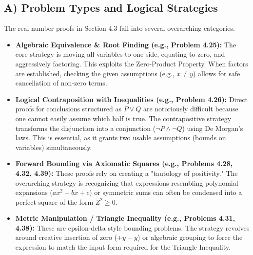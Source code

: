 \documentclass[11pt]{article}
\theoremstyle{definition}
\theoremstyle{remark}
\begin{document}
\begin{itemize}
\subsection{A) Problem Types and Logical Strategies}
The real number proofs in Section 4.3 fall into several overarching categories. 
\begin{itemize}
    \item \textbf{Algebraic Equivalence \& Root Finding (e.g., Problem 4.25):} The core strategy is moving all variables to one side, equating to zero, and aggressively factoring. This exploits the Zero-Product Property. When factors are established, checking the given assumptions (e.g., $x \ne y$) allows for safe cancellation of non-zero terms.
    \item \textbf{Logical Contraposition with Inequalities (e.g., Problem 4.26):} Direct proofs for conclusions structured as $P \lor Q$ are notoriously difficult because one cannot easily assume which half is true. The contrapositive strategy transforms the disjunction into a conjunction ($\neg P \land \neg Q$) using De Morgan's laws. This is essential, as it grants two usable assumptions (bounds on variables) simultaneously.
    \item \textbf{Forward Bounding via Axiomatic Squares (e.g., Problems 4.28, 4.32, 4.39):} These proofs rely on creating a "tautology of positivity." The overarching strategy is recognizing that expressions resembling polynomial expansions ($ax^2 + bx + c$) or symmetric sums can often be condensed into a perfect square of the form $Z^2 \ge 0$.
    \item \textbf{Metric Manipulation / Triangle Inequality (e.g., Problems 4.31, 4.38):} These are epsilon-delta style bounding problems. The strategy revolves around creative insertion of zero ($+y -y$) or algebraic grouping to force the expression to match the input form required for the Triangle Inequality. 
\end{itemize}


\end{itemize}
\end{document}
